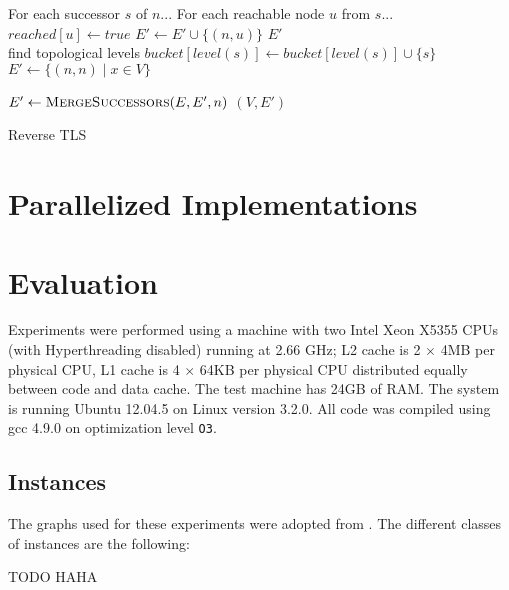 \documentclass[12pt,a4paper,twoside]{article}
\begin{document}
\begin{algorithm}
  \begin{algorithmic}
      \Comment For each successor $s$ of $n$...
        \Comment For each reachable node $u$ from $s$...
            \State $reached[u] \gets true$
            \State $E' \gets E' \cup \{(n,u)\}$
          \EndIf
        \EndFor
      \EndFor
      \State \Return $E'$
    \EndFunction
    \\
    \State find topological levels
      \State $bucket[level(s)] \gets bucket[level(s)] \cup \{s\}$
    \EndFor
    \State $E' \gets \{(n,n) \mid x \in V\}$

        \State $E' \gets \Call{MergeSuccessors}{E, E', n}$
      \EndFor
    \EndFor
    \State \Return $(V, E')$
    \EndFunction
  \end{algorithmic}
  \caption{Reverse TLS}
  \label{algo:RTLS}
\end{algorithm}

\section{Parallelized Implementations}

\section{Evaluation}

Experiments were performed using a machine with two Intel Xeon X5355 CPUs (with Hyperthreading disabled) running at 2.66 GHz; L2 cache is 2 $\times$ 4MB per physical CPU, L1 cache is 4 $\times$ 64KB per physical CPU distributed equally between code and data cache. The test machine has 24GB of RAM.
The system is running Ubuntu 12.04.5 on Linux version 3.2.0. All code was compiled using gcc 4.9.0 on optimization level \texttt{O3}.

\subsection{Instances}

The graphs used for these experiments were adopted from \cite{preach}. The different classes of instances are the following:
\begin{description}
  \item{TODO} HAHA
\end{description}
\end{document}
